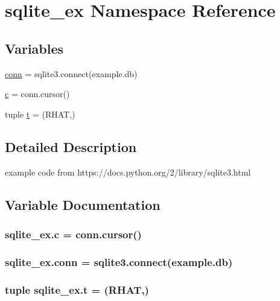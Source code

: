 \hypertarget{namespacesqlite__ex}{}\section{sqlite\+\_\+ex Namespace Reference}
\label{namespacesqlite__ex}
\subsection*{Variables}
\begin{DoxyCompactItemize}
\item 
\hyperlink{namespacesqlite__ex_a89fe76aae630d2d43ba6762138d370c3}{conn} = sqlite3.\+connect(\textquotesingle{}example.\+db\textquotesingle{})
\item 
\hyperlink{namespacesqlite__ex_a6b066dab5be82ad3728dfc291f5eceb3}{c} = conn.\+cursor()
\item 
tuple \hyperlink{namespacesqlite__ex_af4f8174ab3a8358e391386e6ce547ba2}{t} = (\textquotesingle{}R\+H\+AT\textquotesingle{},)
\end{DoxyCompactItemize}


\subsection{Detailed Description}
\begin{DoxyVerb}example code from 
    https://docs.python.org/2/library/sqlite3.html
\end{DoxyVerb}
 

\subsection{Variable Documentation}
\subsubsection[{\texorpdfstring{c}{c}}]{\setlength{\rightskip}{0pt plus 5cm}sqlite\+\_\+ex.\+c = conn.\+cursor()}\hypertarget{namespacesqlite__ex_a6b066dab5be82ad3728dfc291f5eceb3}{}\label{namespacesqlite__ex_a6b066dab5be82ad3728dfc291f5eceb3}
\subsubsection[{\texorpdfstring{conn}{conn}}]{\setlength{\rightskip}{0pt plus 5cm}sqlite\+\_\+ex.\+conn = sqlite3.\+connect(\textquotesingle{}example.\+db\textquotesingle{})}\hypertarget{namespacesqlite__ex_a89fe76aae630d2d43ba6762138d370c3}{}\label{namespacesqlite__ex_a89fe76aae630d2d43ba6762138d370c3}
\subsubsection[{\texorpdfstring{t}{t}}]{\setlength{\rightskip}{0pt plus 5cm}tuple sqlite\+\_\+ex.\+t = (\textquotesingle{}R\+H\+AT\textquotesingle{},)}\hypertarget{namespacesqlite__ex_af4f8174ab3a8358e391386e6ce547ba2}{}\label{namespacesqlite__ex_af4f8174ab3a8358e391386e6ce547ba2}
